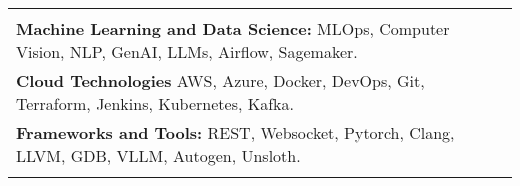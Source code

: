 \documentclass[10pt,a4]{article}
\def\hrulefill{\leavevmode\leaders\hrule height 1pt\hfill\kern0pt}		%
\begin{document}
{\begin{tabu}
\begin{center}
\begin{tabular} {p{} p{} p{} p{}}
\begin{flushleft}
            \hspace{0.5cm}  \textbf{Programming Languages:} Python, C/C++, Spark, SQL, CUDA, Triton, LLVM. \\
            \hspace{0.5cm}  \textbf{Machine Learning and Data Science:} MLOps, Computer Vision, NLP, GenAI, LLMs, Airflow, Sagemaker. \\
            \hspace{0.5cm}  \textbf{Cloud Technologies} AWS, Azure, Docker, DevOps, Git, Terraform, Jenkins, Kubernetes, Kafka. \\
            \hspace{0.5cm}  \textbf{Frameworks and Tools:} REST, Websocket, Pytorch, Clang, LLVM, GDB, VLLM, Autogen, Unsloth. \\

        

\end{flushleft}
		
		
\begin{flushleft}
    {\Large \textbf{WORK EXPERIENCE}} %


\end{flushleft}
\end{tabular}
\end{center}
\end{tabu}}
\end{document}
